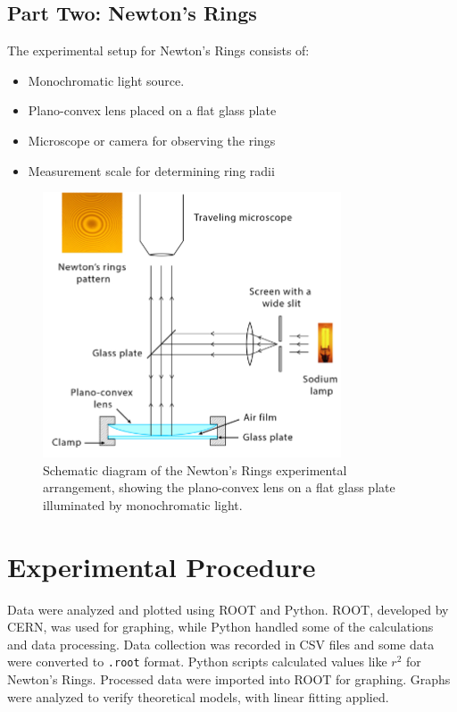\documentclass[journal]{IEEEtran}
\begin{document}
\subsection{Part Two: Newton's Rings}
The experimental setup for Newton's Rings consists of:
\begin{itemize}
    \item Monochromatic light source.
    \item Plano-convex lens placed on a flat glass plate
    \item Microscope or camera for observing the rings
    \item Measurement scale for determining ring radii
\end{itemize}

\begin{figure}[H]
    \centering
    \includegraphics[width=0.8\linewidth]{../IMAGES/newtons_rings_setup_diagram.png}
        \caption{Schematic diagram of the Newton's Rings experimental arrangement, showing the plano-convex lens on a flat glass plate illuminated by monochromatic light.}
    \label{fig:newtons_rings_setup}
\end{figure}

\section{Experimental Procedure}
Data were analyzed and plotted using ROOT and Python. ROOT, 
developed by CERN, was used for graphing, while Python handled some of 
the calculations and data processing. Data collection was recorded 
in CSV files and some data were converted to \texttt{.root} format. 
Python scripts calculated values like $r^2$ for Newton's Rings. Processed data were imported into ROOT for graphing. Graphs were analyzed to verify theoretical models, with linear fitting applied.
\end{document}
